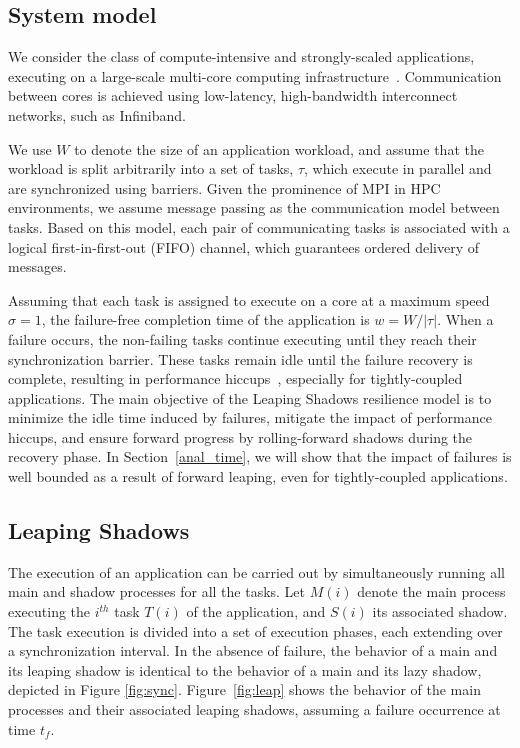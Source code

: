 \subsection {System model}

We consider the class of compute-intensive and strongly-scaled applications, executing on a large-scale multi-core computing infrastructure~\cite{doe_ascr_exascale_2011}. Communication between cores is achieved using low-latency, high-bandwidth interconnect networks, such as Infiniband. 

We use $W$ to denote the size of an application workload, and assume that the workload is split  arbitrarily into a set of tasks, $\tau$, which execute in parallel and are synchronized using barriers. Given the prominence of MPI in HPC environments, we assume message passing as the communication model between tasks. Based on this model, each pair of communicating tasks is associated with a logical first-in-first-out  (FIFO) channel, which guarantees ordered delivery of messages.

Assuming that each task is assigned to execute on a core at a maximum speed $\sigma=1$, the failure-free completion time of the application is $w = W/|\tau|$. When a failure occurs, the non-failing tasks continue executing until they reach their synchronization barrier. These tasks remain idle until the failure recovery is complete, resulting in performance hiccups~\cite{muller2010}, especially for tightly-coupled applications. 
The main objective of the Leaping Shadows resilience model is to minimize the idle time induced by failures, mitigate the impact of performance hiccups, and ensure forward progress by rolling-forward shadows during the recovery phase. In Section~\ref{anal_time}, we will show that the impact of failures is well bounded as a result of forward leaping, even for tightly-coupled applications.






\subsection {Leaping Shadows}

The execution of an application can be carried out by simultaneously running all main and shadow processes for all the tasks. Let $M(i)$ denote the main process executing the $i^{th}$ task $T(i)$ of the application, and $S(i)$ its associated shadow. The task execution is divided into a set of execution phases, each extending over a synchronization interval. In the absence of failure, the behavior of a main  and its leaping shadow is identical to the behavior of a main and its lazy shadow, depicted in Figure \ref{fig:sync}. Figure~\ref{fig:leap} shows the behavior of the main processes and their associated leaping shadows, assuming a failure occurrence at time $t_f$. 


